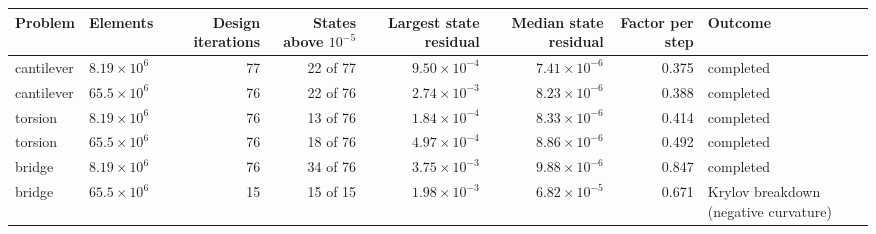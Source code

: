 \begin{tabular}{llrrrrrl}
\toprule
Problem & Elements & Design iterations & States above $10^{-5}$ & Largest state residual & Median state residual & Factor per step & Outcome \\
\midrule
cantilever & $8.19\times10^{6}$ & 77 & 22 of 77 & $9.50\times10^{-4}$ & $7.41\times10^{-6}$ & 0.375 & completed \\
cantilever & $65.5\times10^{6}$ & 76 & 22 of 76 & $2.74\times10^{-3}$ & $8.23\times10^{-6}$ & 0.388 & completed \\
torsion & $8.19\times10^{6}$ & 76 & 13 of 76 & $1.84\times10^{-4}$ & $8.33\times10^{-6}$ & 0.414 & completed \\
torsion & $65.5\times10^{6}$ & 76 & 18 of 76 & $4.97\times10^{-4}$ & $8.86\times10^{-6}$ & 0.492 & completed \\
bridge & $8.19\times10^{6}$ & 76 & 34 of 76 & $3.75\times10^{-3}$ & $9.88\times10^{-6}$ & 0.847 & completed \\
bridge & $65.5\times10^{6}$ & 15 & 15 of 15 & $1.98\times10^{-3}$ & $6.82\times10^{-5}$ & 0.671 & Krylov breakdown (negative curvature) \\
\bottomrule
\end{tabular}
